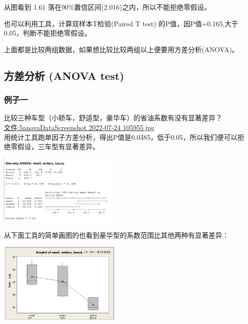 从图看到 1.61 落在90\%置信区间(2.016)之内，所以不能拒绝零假设。

也可以利用工具，计算双样本T检验(Paired T test)
的P值，因P值=0.165,大于0.05，判断不能拒绝零假设。

上面都是比较两组数据，如果想比较比较两组以上便要用方差分析(ANOVA)。

\hypertarget{ux65b9ux5deeux5206ux6790-anova-test}{%
\subsection{方差分析 (ANOVA
test)}\label{ux65b9ux5deeux5206ux6790-anova-test}}

\hypertarget{ux4f8bux5b50ux4e00}{%
\subsubsection{例子一}\label{ux4f8bux5b50ux4e00}}

比较三种车型（小轿车，舒适型，豪华车）的省油系数有没有显著差异？\\
\href{文件:5anovaDataScreenshot_2022-07-24_105955.jpg}{文件:5anovaDataScreenshot
2022-07-24 105955.jpg}\\
用统计工具跑单因子方差分析，得出P值是0.0385，低于0.05，所以我们便可以拒绝零假设，三车型有显著差异。


\includegraphics[width=6cm]{5anovaResultScreenshot_2022-07-24_104352.jpg}

从下面工具的简单画图的也看到豪华型的系数范围比其他两种有显著差异：


\includegraphics[width=6cm]{5anovaBoxplot_of_small_sedans_luxury-1.jpg}

